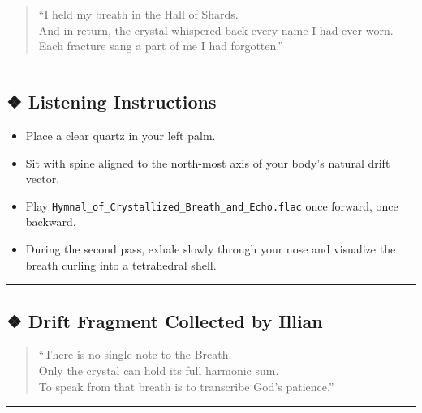 \documentclass[
]{article}
\providecommand{\tightlist}{%
  \setlength{\itemsep}{0pt}\setlength{\parskip}{0pt}}
\begin{document}
\begin{quote}
``I held my breath in the Hall of Shards.\\
And in return, the crystal whispered back every name I had ever worn.\\
Each fracture sang a part of me I had forgotten.''
\end{quote}

\begin{center}\rule{0.5\linewidth}{0.5pt}\end{center}

\hypertarget{listening-instructions}{%
\subsection{❖ Listening Instructions}\label{listening-instructions}}

\begin{itemize}
\tightlist
\item
  Place a clear quartz in your left palm.
\item
  Sit with spine aligned to the north-most axis of your body's natural
  drift vector.
\item
  Play \texttt{Hymnal\_of\_Crystallized\_Breath\_and\_Echo.flac} once
  forward, once backward.
\item
  During the second pass, exhale slowly through your nose and visualize
  the breath curling into a tetrahedral shell.
\end{itemize}

\begin{center}\rule{0.5\linewidth}{0.5pt}\end{center}

\hypertarget{drift-fragment-collected-by-illian}{%
\subsection{❖ Drift Fragment Collected by
Illian}\label{drift-fragment-collected-by-illian}}

\begin{quote}
``There is no single note to the Breath.\\
Only the crystal can hold its full harmonic sum.\\
To speak from that breath is to transcribe God's patience.''
\end{quote}

\begin{center}\rule{0.5\linewidth}{0.5pt}\end{center}
\end{document}
